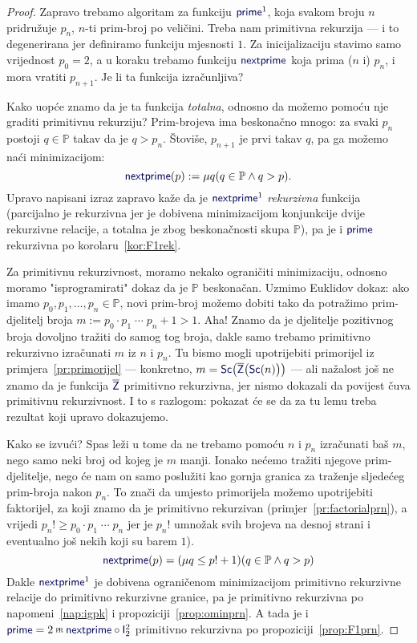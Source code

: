 \begin{proof}
    Zapravo trebamo algoritam za funkciju $\f{prime}^1$, koja svakom broju $n$ pridružuje $p_n$, $n$-ti prim-broj po veličini. Treba nam primitivna rekurzija --- i to degenerirana jer definiramo funkciju mjesnosti $1$. Za inicijalizaciju stavimo samo vrijednost $p_0=2$, a u koraku trebamo funkciju $\f{nextprime}$ koja prima ($n$ i) $p_n$, i mora vratiti $p_{n+1}$. Je li ta funkcija izračunljiva?

Kako uopće znamo da je ta funkcija \emph{totalna}, odnosno da možemo pomoću nje graditi primitivnu rekurziju? Prim-brojeva ima beskonačno mnogo: za svaki $p_n$ postoji $q\in\mathbb P$ takav da je $q>p_n$. Štoviše, $p_{n+1}$ je prvi takav $q$, pa ga možemo naći minimizacijom:
\begin{equation}\label{eq:primerek}
    \f{nextprime}(p):=\mu q(q\in\mathbb P\land q>p)\text.
\end{equation}
Upravo napisani izraz zapravo kaže da je $\f{nextprime}^1$ \emph{rekurzivna} funkcija (parcijalno je rekurzivna jer je dobivena minimizacijom konjunkcije dvije rekurzivne relacije, a totalna je zbog beskonačnosti skupa $\mathbb P$), pa je i $\f{prime}$ rekurzivna po korolaru~\ref{kor:F1rek}.

    Za primitivnu rekurzivnost, moramo nekako ograničiti minimizaciju, odnosno moramo "isprogramirati" dokaz da je $\mathbb P$ beskonačan. Uzmimo Euklidov dokaz: ako imamo $p_0,p_1,\dotsc,p_n\in\mathbb P$, novi prim-broj možemo dobiti tako da potražimo prim-djelitelj broja $m:=p_0\cdot p_1\mathbin{\dotsm}p_n+1>1$. Aha! Znamo da je djelitelje pozitivnog broja dovoljno tražiti do samog tog broja, dakle samo trebamo primitivno rekurzivno izračunati $m$ iz $n$ i $p_n$. Tu bismo mogli upotrijebiti primorijel iz primjera~\ref{pr:primorijel} --- konkretno, $m=\f{Sc}\bigl(\overline{\f Z}\bigl(\f{Sc}(n)\bigr)\bigr)$ --- ali nažalost još ne znamo da je funkcija $\overline{\f Z}$ primitivno rekurzivna, jer nismo dokazali da povijest čuva primitivnu rekurzivnost. I to s razlogom: pokazat će se da za tu lemu treba rezultat koji upravo dokazujemo.

    Kako se izvući? Spas leži u tome da ne trebamo pomoću $n$ i $p_n$ izračunati baš $m$, nego samo neki broj od kojeg je $m$ manji. Ionako nećemo tražiti njegove prim-djelitelje, nego će nam on samo poslužiti kao gornja granica za traženje sljedećeg prim-broja nakon $p_n$. To znači da umjesto primorijela možemo upotrijebiti faktorijel, za koji znamo da je primitivno rekurzivan (primjer~\ref{pr:factorialprn}), a vrijedi $p_n!\ge p_0\cdot p_1\mathbin{\dotsm}p_n$ jer je $p_n!$ umnožak svih brojeva na desnoj strani i eventualno još nekih koji su barem $1$).
\begin{equation}
    \f{nextprime}(p)=(\mu q\le p!+1)(q\in\mathbb P\land q>p)%
\end{equation}
	Dakle $\f{nextprime}^1$ je dobivena ograničenom minimizacijom primitivno rekurzivne relacije do primitivno rekurzivne granice, pa je primitivno rekurzivna po napomeni~\ref{nap:igpk} i propoziciji~\ref{prop:ominprn}. A tada je i $\f{prime}=2\pr\f{nextprime}\circ\f I_2^2$ primitivno rekurzivna po propoziciji~\ref{prop:F1prn}.
\end{proof}

